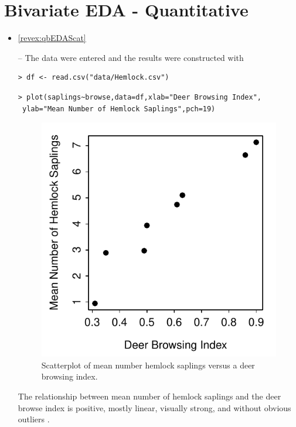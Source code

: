 \documentclass[10pt,openany]{book}\usepackage[]{graphicx}\usepackage[]{color}
\makeatletter
\newenvironment{kframe}{%
 \def\at@end@of@kframe{}%
 \ifinner\ifhmode%
  \def\at@end@of@kframe{\end{minipage}}%
  \begin{minipage}{\columnwidth}%
 \fi\fi%
 \def\FrameCommand##1{\hskip\@totalleftmargin \hskip-\fboxsep
 \colorbox{shadecolor}{##1}\hskip-\fboxsep
     \hskip-\linewidth \hskip-\@totalleftmargin \hskip\columnwidth}%
 \MakeFramed {\advance\hsize-\width
   \@totalleftmargin\z@ \linewidth\hsize
   \@setminipage}}%
 {\par\unskip\endMakeFramed%
 \at@end@of@kframe}
\newenvironment{knitrout}{}{} %
\makeatother
\begin{document}
\section*{Bivariate EDA - Quantitative}
\begin{itemize}
  \item \hypertarget{ans:qbEDAScat}{\ref{revex:qbEDAScat}} --   The data were entered and the results were constructed with

\begin{knitrout}
\color{fgcolor}\begin{kframe}
\begin{verbatim}
> df <- read.csv("data/Hemlock.csv")
\end{verbatim}
\end{kframe}
\end{knitrout}
\begin{knitrout}
\color{fgcolor}\begin{kframe}
\begin{verbatim}
> plot(saplings~browse,data=df,xlab="Deer Browsing Index",
 ylab="Mean Number of Hemlock Saplings",pch=19)
\end{verbatim}
\end{kframe}\begin{figure}[hbtp]

{\centering \includegraphics[width=.4\linewidth]{Figs/HemDeerPlot-1} 

}

\caption[Scatterplot of mean number hemlock saplings versus a deer browsing index]{Scatterplot of mean number hemlock saplings versus a deer browsing index.}\label{fig:HemDeerPlot}
\end{figure}


\end{knitrout}
The relationship between mean number of hemlock saplings and the deer browse index is positive, mostly linear, visually strong, and without obvious outliers .


\end{itemize}
\end{document}
